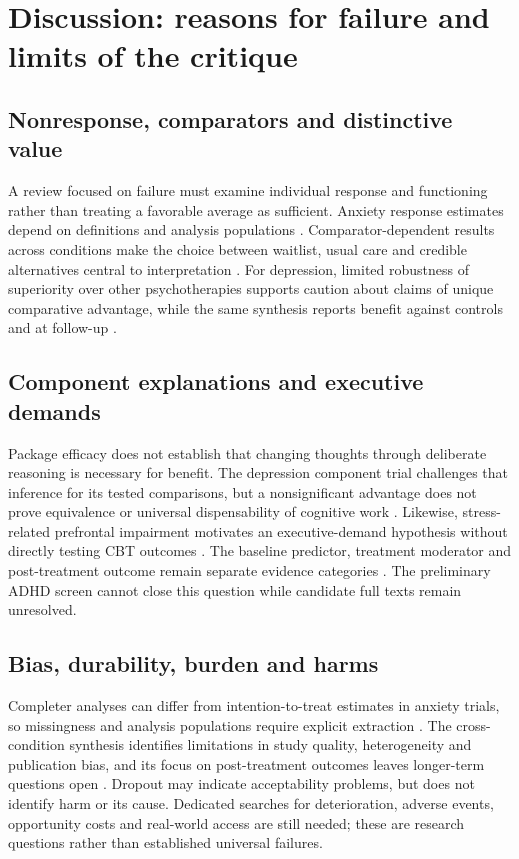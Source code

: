 \section{Discussion: reasons for failure and limits of the critique}
\subsection{Nonresponse, comparators and distinctive value}
A review focused on failure must examine individual response and functioning rather than treating a favorable average as sufficient.
Anxiety response estimates depend on definitions and analysis populations \citep{Loerinc2015}.
Comparator-dependent results across conditions make the choice between waitlist, usual care and credible alternatives central to interpretation \citep{Cuijpers2025}.
For depression, limited robustness of superiority over other psychotherapies supports caution about claims of unique comparative advantage, while the same synthesis reports benefit against controls and at follow-up \citep{Cuijpers2023}.

\subsection{Component explanations and executive demands}
Package efficacy does not establish that changing thoughts through deliberate reasoning is necessary for benefit.
The depression component trial challenges that inference for its tested comparisons, but a nonsignificant advantage does not prove equivalence or universal dispensability of cognitive work \citep{Jacobson1996}.
Likewise, stress-related prefrontal impairment motivates an executive-demand hypothesis without directly testing CBT outcomes \citep{Arnsten2009}.
The baseline predictor, treatment moderator and post-treatment outcome remain separate evidence categories \citep{Kraemer2002}.
The preliminary ADHD screen cannot close this question while candidate full texts remain unresolved.

\subsection{Bias, durability, burden and harms}
Completer analyses can differ from intention-to-treat estimates in anxiety trials, so missingness and analysis populations require explicit extraction \citep{Carpenter2018}.
The cross-condition synthesis identifies limitations in study quality, heterogeneity and publication bias, and its focus on post-treatment outcomes leaves longer-term questions open \citep{Cuijpers2025}.
Dropout may indicate acceptability problems, but does not identify harm or its cause.
Dedicated searches for deterioration, adverse events, opportunity costs and real-world access are still needed; these are research questions rather than established universal failures.


